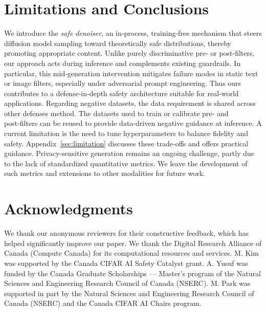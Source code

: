 \section{Limitations and Conclusions}
We introduce the \textit{safe denoiser}, an in‑process, training‑free mechanism that steers diffusion model sampling toward theoretically safe distributions, thereby promoting appropriate content. Unlike purely discriminative pre‑ or post‑filters, our approach acts during inference and complements existing guardrails. In particular, this mid‑generation intervention mitigates failure modes in static text or image filters, especially under adversarial prompt engineering. Thus ours contributes to a defense‑in‑depth safety architecture suitable for real‑world applications. Regarding negative datasets, the data requirement is shared across other defenses method. The datasets used to train or calibrate pre‑ and post‑filters can be reused to provide data‑driven negative guidance at inference. A current limitation is the need to tune hyperparameters to balance fidelity and safety. Appendix~\ref{sec:limitation} discusses these trade‑offs and offers practical guidance. Privacy-sensitive generation remains an ongoing challenge, partly due to the lack of standardized quantitative metrics. We leave the development of such metrics and extensions to other modalities for future work. 
\label{sec_conclusion}

\section*{Acknowledgments}
We thank our anonymous reviewers for their constructive feedback, which has helped significantly improve
our paper. We thank the Digital Research Alliance of Canada (Compute Canada) for its computational
resources and services. 
%
M. Kim was supported by the Canada CIFAR AI Safety Catalyst grant.
%
A. Yusuf was funded by the Canada Graduate Scholarships — Master’s program of the Natural Sciences and Engineering Research Council of Canada (NSERC).
%  
M. Park was supported in part by the Natural Sciences and Engineering
Research Council of Canada (NSERC) and the Canada CIFAR AI Chairs program.

